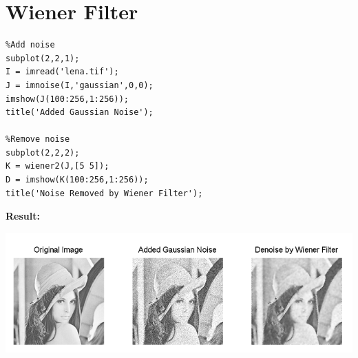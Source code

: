 \section{Wiener Filter}


\begin{lstlisting}
%Add noise
subplot(2,2,1);
I = imread('lena.tif');
J = imnoise(I,'gaussian',0,0);
imshow(J(100:256,1:256));
title('Added Gaussian Noise');

%Remove noise
subplot(2,2,2);
K = wiener2(J,[5 5]);
D = imshow(K(100:256,1:256));
title('Noise Removed by Wiener Filter');
\end{lstlisting} 

\textbf{Result:}
\vspace{1cm}
\begin{center}
\includegraphics{Wiener.png}
\end{center}







